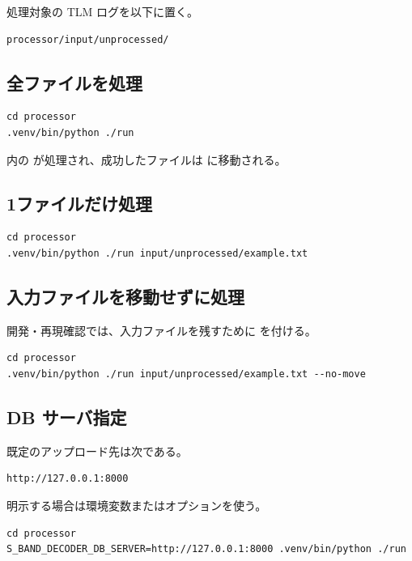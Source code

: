 \documentclass[a4paper,11pt]{ltjsarticle}
\begin{document}
処理対象の  TLM ログを以下に置く。

\begin{verbatim}
processor/input/unprocessed/
\end{verbatim}

\subsection{全ファイルを処理}

\begin{verbatim}
cd processor
.venv/bin/python ./run
\end{verbatim}

 内の  が処理され、成功したファイルは  に移動される。

\subsection{1ファイルだけ処理}

\begin{verbatim}
cd processor
.venv/bin/python ./run input/unprocessed/example.txt
\end{verbatim}

\subsection{入力ファイルを移動せずに処理}

開発・再現確認では、入力ファイルを残すために  を付ける。

\begin{verbatim}
cd processor
.venv/bin/python ./run input/unprocessed/example.txt --no-move
\end{verbatim}

\subsection{DB サーバ指定}

既定のアップロード先は次である。

\begin{verbatim}
http://127.0.0.1:8000
\end{verbatim}

明示する場合は環境変数またはオプションを使う。

\begin{verbatim}
cd processor
S_BAND_DECODER_DB_SERVER=http://127.0.0.1:8000 .venv/bin/python ./run
\end{verbatim}
\end{document}
